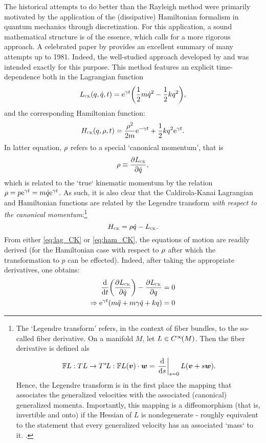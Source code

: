 The historical attempts to do better than the Rayleigh method were primarily motivated by the application of the (dissipative) Hamiltonian formalism in quantum mechanics through discretization. For this application, a sound mathematical structure is of the essence, which calls for a more rigorous approach. A celebrated paper by
\citet{Dekker1981} provides an excellent summary of many attempts up to 1981. Indeed, the well-studied approach developed by \citet{Caldirola1941} and \citet{Kanai1948} was intended exactly for this purpose. This method features an explicit time-dependence both in the Lagrangian function
\begin{equation}
    L_\text{\tiny{\textsc{CK}}}(q, \dot{q}, t) = \mathrm{e}^{\gamma t}\qty(\frac{1}{2}m\dot{q}^2 - \frac{1}{2}kq^2),
    \label{eq:lag_CK}
\end{equation}
and the corresponding Hamiltonian function:
\begin{equation}
    H_\text{\tiny{\textsc{CK}}}(q, \rho, t) = \frac{\rho^2}{2m}\mathrm{e}^{-\gamma t} + \frac{1}{2}kq^2\mathrm{e}^{\gamma t}.
    \label{eq:ham_CK}
\end{equation}
In latter equation, $\rho$ refers to a special `canonical momentum', that is
$$ \rho \equiv \pdv{\ensuremath{L_\text{\tiny{\textsc{CK}}}}}{\dot{q}}, $$
which is related to the `true` kinematic momentum by the relation $\rho = p\mathrm{e}^{\gamma
t} = m\dot{q}\mathrm{e}^{\gamma t}$. As such, it is also clear that the Caldirola-Kanai Lagrangian and Hamiltonian functions are related by the Legendre transform \emph{with respect to the canonical momentum}:\footnote{The `Legendre transform'
refers, in the context of fiber bundles, to the so-called fiber derivative. On a manifold $M$, let $L \in
C^\infty\!\qty(M)$. Then the fiber derivative is defined als 
    $$ \fiberder{L}: \tbundle{L}\to\ctbundle{L}: \fiberder{L}(\vec{v})\cdot\vec{w} = \left. \dv{}{s}\right\vert_{s = 0} L(\vec{v} +
    s\vec{w}). $$
 Hence, the Legendre transform is in the first place the mapping that associates the generalized velocities with the
 associated (canonical) generalized momenta. Importantly, this mapping is a diffeomorphism (that is, invertible and onto) if the Hessian of
 $L$ is nondegenerate - roughly equivalent to the statement that every generalized velocity has an associated `mass` to
 it. \cite{Marsden1998}.}
$$ H_\text{\tiny{\textsc{CK}}} = \rho \dot{q} - L_\text{\tiny{\textsc{CK}}}. $$
From either \cref{eq:lag_CK} or \cref{eq:ham_CK}, the equations of motion are readily
derived (for the Hamiltonian case with respect to $\rho$ after which the transformation to $p$ can be effected).
Indeed, after taking the appropriate derivatives, one obtains:
\begin{equation*} 
    \begin{split}
        \dv{}{t}\qty(\pdv{\ensuremath{L_\text{\tiny{\textsc{CK}}}}}{\dot{q}}) - \pdv{\ensuremath{L_\text{\tiny{\textsc{CK}}}}}{q} &= 0 \\
        \Rightarrow \mathrm{e}^{\gamma t}\qty(m\ddot{q} + m\gamma\dot{q} + kq) &= 0
    \end{split}
\end{equation*}
